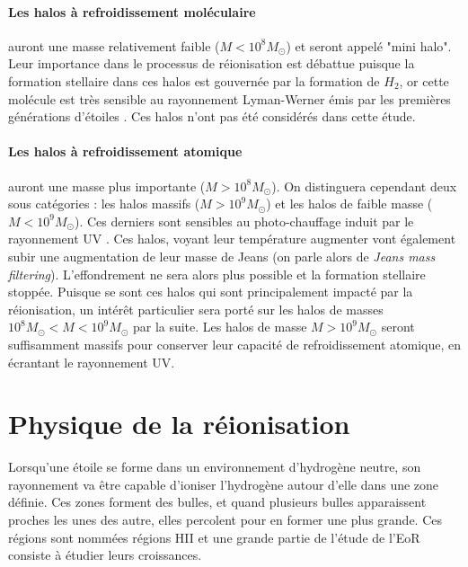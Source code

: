 \paragraph{Les halos à refroidissement moléculaire} auront une masse relativement faible ($M < 10^8 M_\odot$) et seront appelé "mini halo".
Leur importance dans le processus de réionisation est débattue \citep{2012ApJ...756L..16A} puisque la formation stellaire dans ces halos est gouvernée par la formation de $H_2$, or cette molécule est très sensible au rayonnement Lyman-Werner émis par les premières générations d'étoiles \citep{2002ApJ...575...49R}.
Ces halos n'ont pas été considérés dans cette étude.

\paragraph{Les halos à refroidissement atomique} auront une masse plus importante ($M > 10^8 M_\odot$).
On distinguera cependant deux sous catégories : les halos massifs ($M > 10^9 M_\odot$) et les halos de faible masse ($M< 10^9 M_\odot$).
Ces derniers sont sensibles au photo-chauffage induit par le rayonnement UV \citep{1998ApJ...497...21M}.
Ces halos, voyant leur température augmenter vont également subir une augmentation de leur masse de Jeans (on parle alors de \textit{Jeans mass filtering}).
L'effondrement ne sera alors plus possible et la formation stellaire stoppée.
Puisque se sont ces halos qui sont principalement impacté par la réionisation, un intérêt particulier sera porté sur les halos de masses $10^8 M_\odot < M< 10^9 M_\odot$ par la suite.
Les halos de masse $M > 10^9 M_\odot$ seront suffisamment massifs pour conserver leur capacité de refroidissement atomique, en écrantant le rayonnement UV.

\section{Physique de la réionisation}

Lorsqu'une étoile se forme dans un environnement d'hydrogène neutre, son rayonnement va être capable d'ioniser l'hydrogène autour d'elle dans une zone définie.
Ces zones forment des bulles, et quand plusieurs bulles apparaissent proches les unes des autre, elles percolent pour en former une plus grande.
Ces régions sont nommées régions HII et une grande partie de l'étude de l'\ac{EoR} consiste à étudier leurs croissances.

